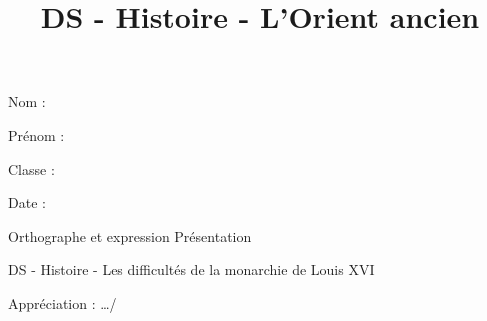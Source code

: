 \documentclass[a4paper,12pt]{exam}
\title{DS - Histoire - L'Orient ancien}
\begin{document}
\begin{minipage}{4cm}
  Nom :
  
  Prénom :
  
  Classe : 
  
  Date : 
\end{minipage}
\hfill
\begin{minipage}{3.5cm}

{\small \begin{questions} \question[1] Orthographe et expression
\question[1] Présentation \end{questions}
}
\end{minipage}


\vspace{1cm}

\begin{center}

{\Large DS - Histoire - Les difficultés de la monarchie de Louis XVI}

\vspace{0.5cm}
  \end{center}
Appréciation : \hfill {\large …/\numpoints\ } %
\end{document}
